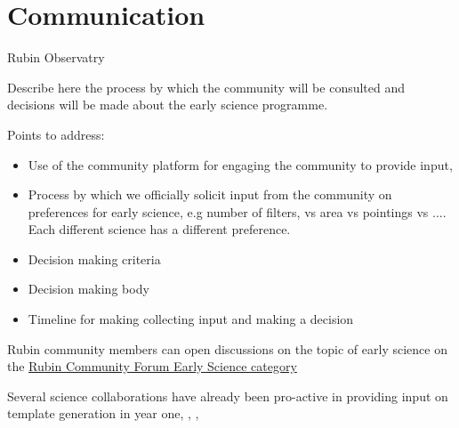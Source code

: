 
\section{Communication}

Rubin Observatry 

Describe here the process by which the community will be consulted and decisions will be made about the early science programme. 

Points to address:
\begin{itemize}
\item Use of the community platform for engaging the community to provide input,
\item Process by which we officially solicit  input from the community on preferences for early science, e.g number of filters, vs area vs pointings vs .... Each different science has a different preference. 
\item Decision making criteria 
\item Decision making body
\item Timeline for making collecting input and making a decision
\end{itemize}

Rubin community members can open discussions on the topic of early science on the \href{https://community.lsst.org/t/about-the-early-science-category/5775}{Rubin Community Forum Early Science category}

Several science collaborations have already been pro-active in providing input on template generation in year one, , , 
